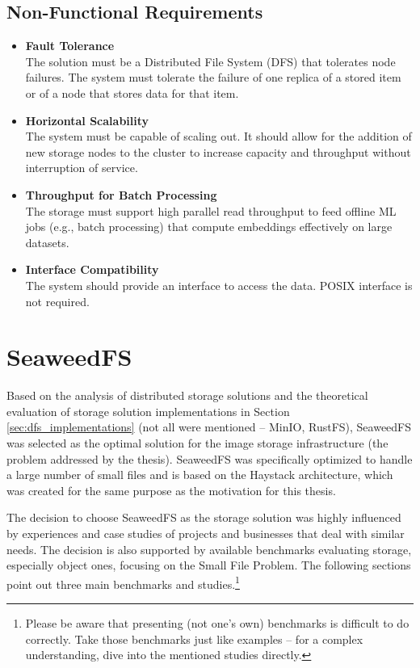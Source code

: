 \subsection{Non-Functional Requirements}
\begin{itemize}
    \item \textbf{Fault Tolerance} \\
    The solution must be a Distributed File System (DFS) that tolerates node failures. The system must tolerate the failure of one replica of a stored item or of a node that stores data for that item.
    \item \textbf{Horizontal Scalability} \\
    The system must be capable of scaling out. It should allow for the addition of new storage nodes to the cluster to increase capacity and throughput without interruption of service.
    \item \textbf{Throughput for Batch Processing} \\
    The storage must support high parallel read throughput to feed offline ML jobs (e.g., batch processing) that compute embeddings effectively on large datasets.
    \item \textbf{Interface Compatibility} \\
    The system should provide an interface to access the data. POSIX interface is not required.
\end{itemize}

\section{SeaweedFS}
Based on the analysis of distributed storage solutions and the theoretical evaluation of storage solution implementations in Section \ref{sec:dfs_implementations} (not all were mentioned -- MinIO, RustFS), SeaweedFS was selected as the optimal solution for the image storage infrastructure (the problem addressed by the thesis). 
SeaweedFS was specifically optimized to handle a large number of small files and is based on the Haystack architecture, which was created for the same purpose as the motivation for this thesis.

The decision to choose SeaweedFS as the storage solution was highly influenced by experiences and case studies of projects and businesses that deal with similar needs. The decision is also supported by available benchmarks evaluating storage, especially object ones, focusing on the Small File Problem. The following sections point out three main benchmarks and studies.\footnote{Please be aware that presenting (not one's own) benchmarks is difficult to do correctly. Take those benchmarks just like examples -- for a complex understanding, dive into the mentioned studies directly.} 

